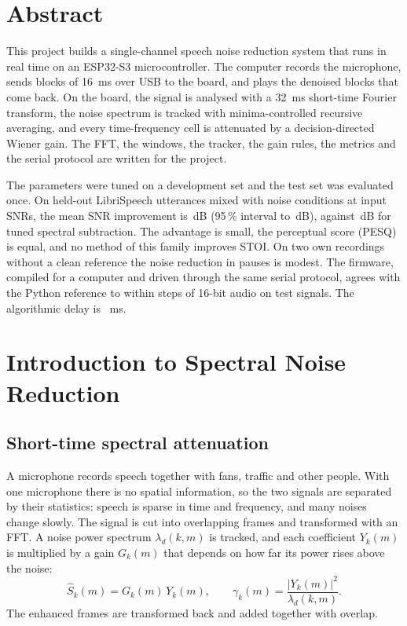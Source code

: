 \documentclass[11pt,a4paper]{article}
\numberwithin{figure}{section}
\numberwithin{table}{section}
\numberwithin{equation}{section}
\newcommand{\dB}{\,dB}
\begin{document}
\setcounter{page}{2}
\renewcommand{\contentsname}{\fontsize{24}{28}\selectfont Contents}
\tableofcontents
\clearpage

\section*{Abstract}
This project builds a single-channel speech noise reduction system that runs in real time on an
ESP32-S3 microcontroller. The computer records the microphone, sends blocks of 16~ms over USB to the
board, and plays the denoised blocks that come back. On the board, the signal is analysed with a
32~ms short-time Fourier transform, the noise spectrum is tracked with minima-controlled recursive
averaging, and every time-frequency cell is attenuated by a decision-directed Wiener gain. The FFT,
the windows, the tracker, the gain rules, the metrics and the serial protocol are written for the
project.

The parameters were tuned on a development set and the test set was evaluated once. On \valNUtt{}
held-out LibriSpeech utterances mixed with \valNNoise{} noise conditions at \valNSnr{} input SNRs, the
mean SNR improvement is \valDsnrBfive\dB{} (95\,\% interval \valDsnrBfiveLo{} to \valDsnrBfiveHi\dB),
against \valDsnrBone\dB{} for tuned spectral subtraction. The advantage is small, the perceptual score
(PESQ) is equal, and no method of this family improves STOI. On two own recordings without a clean
reference the noise reduction in pauses is modest. The firmware, compiled for a computer and driven
through the same serial protocol, agrees with the Python reference to within \valFwMaxSteps{} steps of
16-bit audio on \valFwSignals{} test signals. The algorithmic delay is \valDelayMs~ms.

\section{Introduction to Spectral Noise Reduction}
\subsection{Short-time spectral attenuation}
A microphone records speech together with fans, traffic and other people. With one microphone there is
no spatial information, so the two signals are separated by their statistics: speech is sparse in time
and frequency, and many noises change slowly. The signal is cut into overlapping frames and
transformed with an FFT. A noise power spectrum $\lambda_d(k,m)$ is tracked, and each coefficient
$Y_k(m)$ is multiplied by a gain $G_k(m)$ that depends on how far its power rises above the noise:
\begin{equation}
\hat S_k(m) = G_k(m)\,Y_k(m), \qquad \gamma_k(m)=\frac{|Y_k(m)|^2}{\lambda_d(k,m)}.
\end{equation}
The enhanced frames are transformed back and added together with overlap.
\end{document}
